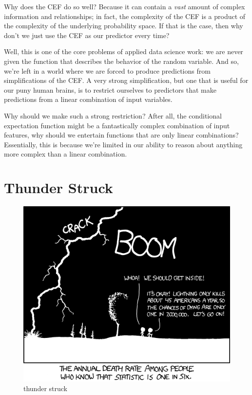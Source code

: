 \documentclass[
]{book}
\theoremstyle{definition}
\theoremstyle{definition}
\theoremstyle{definition}
\theoremstyle{definition}
\theoremstyle{remark}
\begin{document}
Why does the CEF do so well? Because it can contain a \emph{vast} amount of complex information and relationships; in fact, the complexity of the CEF is a product of the complexity of the underlying probability space. If that is the case, then why don't we just use the CEF as our predictor every time?

Well, this is one of the core problems of applied data science work: we are never given the function that describes the behavior of the random variable. And so, we're left in a world where we are forced to produce predictions from simplifications of the CEF. A very strong simplification, but one that is useful for our puny human brains, is to restrict ourselves to predictors that make predictions from a linear combination of input variables.

Why should we make such a strong restriction? After all, the conditional expectation function might be a fantastically complex combination of input features, why should we entertain functions that are only linear combinations? Essentially, this is because we're limited in our ability to reason about anything more complex than a linear combination.

\hypertarget{thunder-struck}{%
\section{Thunder Struck}\label{thunder-struck}}

\begin{figure}
\centering
\includegraphics{./images/conditional_risk.png}
\caption{thunder struck}
\end{figure}
\end{document}
